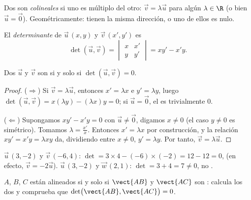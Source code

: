 \begin{definition}\label{def:g11:vect:collinear}
Dos  son \emph{colineales} si uno es
múltiplo del otro: $\vec v = \lambda \vec u$ para algún $\lambda \in \R$
(o bien $\vec u = \vec 0$). Geométricamente: tienen la misma dirección, o
uno de ellos es nulo.
\end{definition}

\begin{definition}[Determinante]\label{def:g11:vect:det}
El \emph{determinante} de $\vec u\,(x, y)$ y
$\vec v\,(x', y')$ es
\[
\det(\vec u, \vec v) =
\begin{vmatrix} x & x' \\ y & y' \end{vmatrix}
= x y' - x' y .
\]
\end{definition}

\begin{theorem}\label{thm:g11:vect:collinearity}
Dos  $\vec u$ y $\vec v$ son  si y solo si
$\det(\vec u, \vec v) = 0$.
\end{theorem}

\begin{proof}
($\Rightarrow$) Si $\vec v = \lambda\vec u$, entonces $x' = \lambda x$ e
$y' = \lambda y$, luego
$\det(\vec u, \vec v) = x(\lambda y) - (\lambda x)y = 0$; si
$\vec u = \vec 0$, el  es trivialmente $0$.

($\Leftarrow$) Supongamos $xy' - x'y = 0$ con $\vec u \neq \vec 0$,
digamos $x \neq 0$ (el caso $y \neq 0$ es simétrico). Tomamos
$\lambda = \frac{x'}{x}$. Entonces $x' = \lambda x$ por construcción, y la
relación $xy' = x'y = \lambda x y$ da, dividiendo entre $x \neq 0$,
$y' = \lambda y$. Por tanto, $\vec v = \lambda \vec u$.
\end{proof}

\begin{example}\label{ex:g11:vect:collinear}
$\vec u\,(3, -2)$ y $\vec v\,(-6, 4)$:
$\det = 3 \times 4 - (-6) \times (-2) = 12 - 12 = 0$,  (en
efecto, $\vec v = -2\vec u$). $\vec u\,(3, -2)$ y $\vec w\,(2, 1)$:
$\det = 3 + 4 = 7 \neq 0$, no .
\end{example}

\begin{method}\label{met:g11:vect:alignment}
$A$, $B$, $C$ están alineados si y solo si $\vect{AB}$ y $\vect{AC}$ son
: calcula los dos  y comprueba que
$\det\bigl(\vect{AB}, \vect{AC}\bigr) = 0$.
\end{method}

